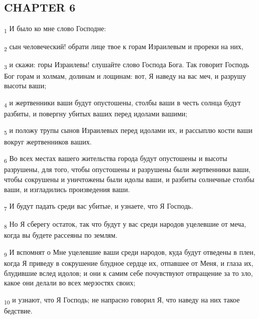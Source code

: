 \subsection{CHAPTER 6}
\begin{tcolorbox}
\textsubscript{1} И было ко мне слово Господне:
\end{tcolorbox}
\begin{tcolorbox}
\textsubscript{2} сын человеческий! обрати лице твое к горам Израилевым и прореки на них,
\end{tcolorbox}
\begin{tcolorbox}
\textsubscript{3} и скажи: горы Израилевы! слушайте слово Господа Бога. Так говорит Господь Бог горам и холмам, долинам и лощинам: вот, Я наведу на вас меч, и разрушу высоты ваши;
\end{tcolorbox}
\begin{tcolorbox}
\textsubscript{4} и жертвенники ваши будут опустошены, столбы ваши в честь солнца будут разбиты, и повергну убитых ваших перед идолами вашими;
\end{tcolorbox}
\begin{tcolorbox}
\textsubscript{5} и положу трупы сынов Израилевых перед идолами их, и рассыплю кости ваши вокруг жертвенников ваших.
\end{tcolorbox}
\begin{tcolorbox}
\textsubscript{6} Во всех местах вашего жительства города будут опустошены и высоты разрушены, для того, чтобы опустошены и разрушены были жертвенники ваши, чтобы сокрушены и уничтожены были идолы ваши, и разбиты солнечные столбы ваши, и изгладились произведения ваши.
\end{tcolorbox}
\begin{tcolorbox}
\textsubscript{7} И будут падать среди вас убитые, и узнаете, что Я Господь.
\end{tcolorbox}
\begin{tcolorbox}
\textsubscript{8} Но Я сберегу остаток, так что будут у вас среди народов уцелевшие от меча, когда вы будете рассеяны по землям.
\end{tcolorbox}
\begin{tcolorbox}
\textsubscript{9} И вспомнят о Мне уцелевшие ваши среди народов, куда будут отведены в плен, когда Я приведу в сокрушение блудное сердце их, отпавшее от Меня, и глаза их, блудившие вслед идолов; и они к самим себе почувствуют отвращение за то зло, какое они делали во всех мерзостях своих;
\end{tcolorbox}
\begin{tcolorbox}
\textsubscript{10} и узнают, что Я Господь; не напрасно говорил Я, что наведу на них такое бедствие.
\end{tcolorbox}
